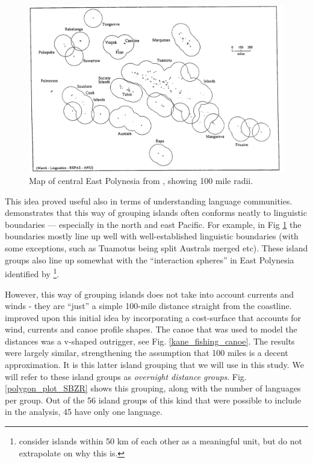 \documentclass[unnumsec,webpdf,modern,medium]{oup-authoring-template}
\begin{document}
\begin{appendices}
\begin{figure}[ht]
\centering
\includegraphics[width=\textwidth]{marck_2000_east_poly}
\caption{{Map of central East Polynesia from \citet{marck2000}, showing 100 mile radii.}}
\label{Marck_2000_east_poly}
\end{figure}

This idea proved useful also in terms of understanding language communities. \citet{mark_1986, marck2000} demonstrates that this way of grouping islands often conforms neatly to linguistic boundaries --- especially in the north and east Pacific. For example, in Fig  \ref{Marck_2000_east_poly} the boundaries mostly line up well with well-established linguistic boundaries (with some exceptions, such as Tuamotus being split Australs merged etc). These island groups also line up somewhat with the ``interaction spheres'' in East Polynesia identified by \citet{rolett2002voyaging}\footnote{\citet{rolett2004environmental} consider islands within 50 km of each other as a meaningful unit, but do not extrapolate on why this is.}. 

However, this way of grouping islands does not take into account currents and winds - they are ``just'' a simple 100-mile distance straight from the coastline. \citet{NZSA_overnight_2023} improved upon this initial idea by incorporating a cost-surface that accounts for wind, currents and canoe profile shapes. The canoe that was used to model the distances was a v-shaped outrigger, see Fig. \ref{kane_fishing_canoe}. The results were largely similar, strengthening the assumption that 100 miles is a decent approximation. It is this latter island grouping that we will use in this study. We will refer to these island groups as \textit{overnight distance groups}. Fig. \ref{polygon_plot_SBZR} shows this grouping, along with the number of languages per group. Out of the 56 island groups of this kind that were possible to include in the analysis, 45 have only one language.


\end{appendices}
\end{document}
